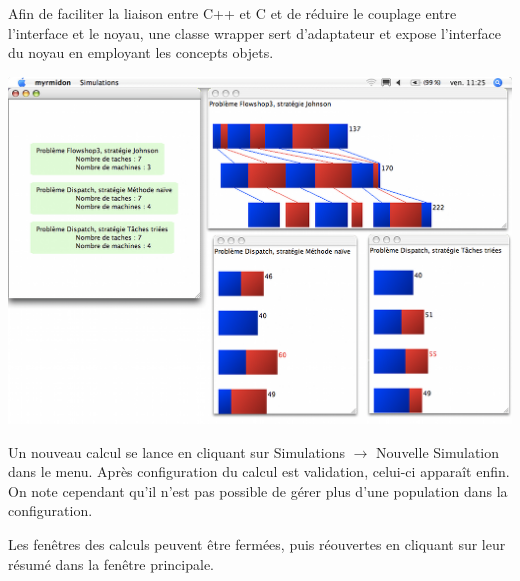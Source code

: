 Afin de faciliter la liaison entre C++ et C et de réduire le couplage entre
l'interface et le noyau, une classe wrapper sert d'adaptateur et expose
l'interface du noyau en employant les concepts objets.
\begin{center}
\includegraphics{myrmidon.png}
\end{center}
Un nouveau calcul se lance en cliquant sur Simulations $\rightarrow$ Nouvelle
Simulation dans le menu. Après configuration du calcul est validation, celui-ci
apparaît enfin. On note cependant qu'il n'est pas possible de gérer plus d'une
population dans la configuration.

Les fenêtres des calculs peuvent être fermées, puis réouvertes en cliquant sur leur résumé dans la fenêtre principale.
